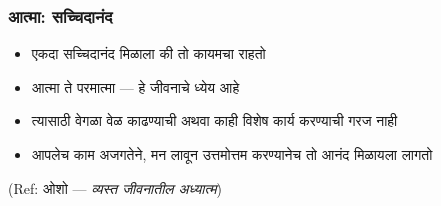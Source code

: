 \begin{frame}[fragile]\frametitle{आत्मा: सच्चिदानंद}

	\begin{itemize}
	\item एकदा सच्चिदानंद मिळाला की तो कायमचा राहतो
	\item आत्मा ते परमात्मा --- हे जीवनाचे ध्येय आहे
	\item त्यासाठी वेगळा वेळ काढण्याची अथवा काही विशेष कार्य करण्याची गरज नाही
	\item आपलेच काम अजगतेने, मन लावून उत्तमोत्तम करण्यानेच तो आनंद मिळायला लागतो
	\end{itemize}

{\tiny (Ref: ओशो --- \textit{व्यस्त जीवनातील अध्यात्म})}

\end{frame}
